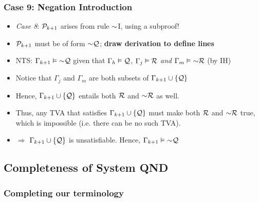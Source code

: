 \begin{frame}
\frametitle{Case 9: Negation Introduction}

\begin{itemize}[<+->]

\item \emph{Case 8}: $\mathcal{P}_{k +1}$ arises from rule $\enot${}I, using a subproof! 

\item $\mathcal{P}_{k +1}$ must be of form $\enot \metav{Q}$; \textbf{draw derivation to define lines}

\item NTS: $\Gamma_{k+1} \entails \enot \metav{Q}$ given that $\Gamma_h \vDash \mathcal{Q}$, $\Gamma_j \vDash \mathcal{R}$ \emph{and} $\Gamma_m \entails \enot \metav{R}$ (by IH)

\item Notice that $\Gamma_j$ and $\Gamma_m$ are both subsets of $\Gamma_{k+1} \cup \{ \mathcal{Q}\}$ 

\item[] Hence, $\Gamma_{k+1} \cup \{ \mathcal{Q}\}$ entails both $\mathcal{R}$ and $\enot \metav{R}$ as well. 

\item[] Thus, any TVA that satisfies $\Gamma_{k+1} \cup \{ \mathcal{Q}\}$ must make both $\mathcal{R}$ and $\enot \metav{R}$ true, which is impossible (i.e. there can be no such TVA). 
\item[] $\Rightarrow$ $\Gamma_{k+1} \cup \{ \mathcal{Q}\}$ is unsatisfiable. Hence, $\Gamma_{k+1} \entails \enot \metav{Q}$


\end{itemize}
\end{frame}

\fi 

\iffalse %

\subsection{Completeness of System QND}

\subsubsection{Completing our terminology}

